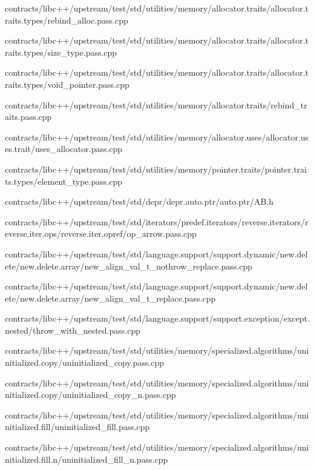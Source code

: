 \begin{DoxyCompactItemize}
contracts/libc++/upstream/test/std/utilities/memory/allocator.\+traits/allocator.\+traits.\+types/rebind\+\_\+alloc.\+pass.\+cpp\item 
contracts/libc++/upstream/test/std/utilities/memory/allocator.\+traits/allocator.\+traits.\+types/size\+\_\+type.\+pass.\+cpp\item 
contracts/libc++/upstream/test/std/utilities/memory/allocator.\+traits/allocator.\+traits.\+types/void\+\_\+pointer.\+pass.\+cpp\item 
contracts/libc++/upstream/test/std/utilities/memory/allocator.\+traits/rebind\+\_\+traits.\+pass.\+cpp\item 
contracts/libc++/upstream/test/std/utilities/memory/allocator.\+uses/allocator.\+uses.\+trait/uses\+\_\+allocator.\+pass.\+cpp\item 
contracts/libc++/upstream/test/std/utilities/memory/pointer.\+traits/pointer.\+traits.\+types/element\+\_\+type.\+pass.\+cpp\item 
contracts/libc++/upstream/test/std/depr/depr.\+auto.\+ptr/auto.\+ptr/A\+B.\+h\item 
contracts/libc++/upstream/test/std/iterators/predef.\+iterators/reverse.\+iterators/reverse.\+iter.\+ops/reverse.\+iter.\+opref/op\+\_\+arrow.\+pass.\+cpp\item 
contracts/libc++/upstream/test/std/language.\+support/support.\+dynamic/new.\+delete/new.\+delete.\+array/new\+\_\+align\+\_\+val\+\_\+t\+\_\+nothrow\+\_\+replace.\+pass.\+cpp\item 
contracts/libc++/upstream/test/std/language.\+support/support.\+dynamic/new.\+delete/new.\+delete.\+array/new\+\_\+align\+\_\+val\+\_\+t\+\_\+replace.\+pass.\+cpp\item 
contracts/libc++/upstream/test/std/language.\+support/support.\+exception/except.\+nested/throw\+\_\+with\+\_\+nested.\+pass.\+cpp\item 
contracts/libc++/upstream/test/std/utilities/memory/specialized.\+algorithms/uninitialized.\+copy/uninitialized\+\_\+copy.\+pass.\+cpp\item 
contracts/libc++/upstream/test/std/utilities/memory/specialized.\+algorithms/uninitialized.\+copy/uninitialized\+\_\+copy\+\_\+n.\+pass.\+cpp\item 
contracts/libc++/upstream/test/std/utilities/memory/specialized.\+algorithms/uninitialized.\+fill/uninitialized\+\_\+fill.\+pass.\+cpp\item 
contracts/libc++/upstream/test/std/utilities/memory/specialized.\+algorithms/uninitialized.\+fill.\+n/uninitialized\+\_\+fill\+\_\+n.\+pass.\+cpp\item 

\end{DoxyCompactItemize}
